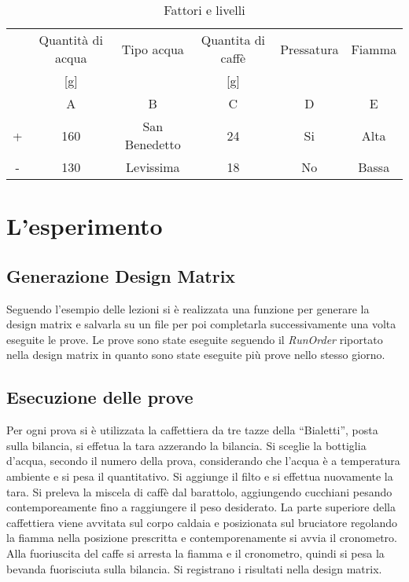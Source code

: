 \begin{table}[htb]
  \caption{Fattori e livelli}
  \label{tab:factorLvl}
  \begin{tabular}{cccccc}
    \hline
    & Quantità di acqua & Tipo acqua & Quantita di caffè & Pressatura & Fiamma\\
    & [g] &  & [g] &  & \\
    \hline
    & A &B&C&D&E\\
    \hline
  + & 160 & San Benedetto & 24 & Si & Alta\\
  - & 130 & Levissima & 18 & No & Bassa\\
  \hline
  \end{tabular}
\end{table}
\newpage
\section{L'esperimento}
\subsection{Generazione Design Matrix}
Seguendo l'esempio delle lezioni si è realizzata una funzione per generare la design matrix e salvarla su un file per poi completarla successivamente una volta eseguite le prove.
Le prove sono state eseguite seguendo il \emph{RunOrder} riportato nella design matrix in quanto sono state eseguite più prove nello stesso giorno.
\subsection{Esecuzione delle prove}
Per ogni prova si è utilizzata la caffettiera da tre tazze della “Bialetti”, posta sulla bilancia, si effetua la tara azzerando la bilancia. Si sceglie la bottiglia d'acqua, secondo il numero della prova, considerando che l'acqua è a temperatura ambiente e si pesa il quantitativo. Si aggiunge il filto e si effettua nuovamente la tara.
Si preleva la miscela di caffè dal barattolo, aggiungendo cucchiani  pesando contemporeamente fino a raggiungere il peso desiderato.
La parte superiore della caffettiera viene avvitata sul corpo caldaia e posizionata sul bruciatore regolando la fiamma nella posizione prescritta e contemporenamente si avvia il cronometro.
Alla fuoriuscita del caffe si arresta la fiamma e il cronometro, quindi si pesa la bevanda fuorisciuta sulla bilancia.
Si registrano i risultati nella design matrix.

